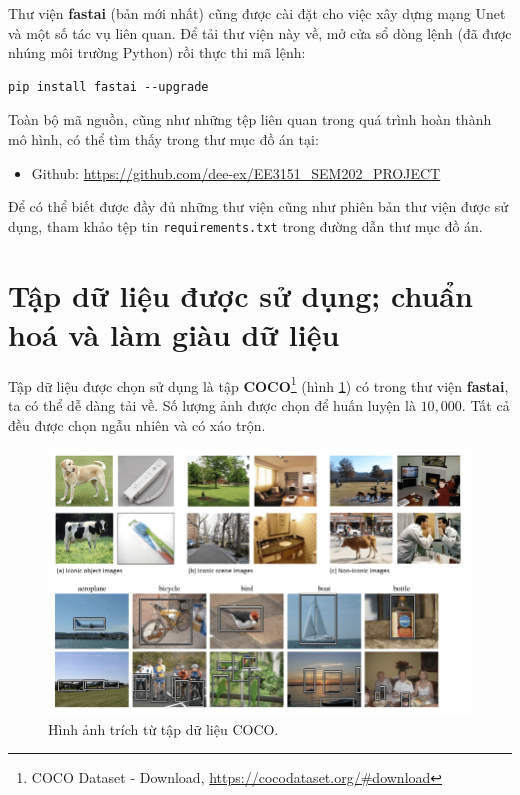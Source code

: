 \documentclass[a4paper, 12pt]{report}
\begin{document}
Thư viện \textbf{fastai} (bản mới nhất) cũng được cài đặt cho việc xây dựng mạng Unet và một số tác vụ liên quan.
Để tải thư viện này về, mở cửa sổ dòng lệnh (đã được nhúng môi trường Python) rồi thực thi mã lệnh:

\begin{lstlisting}
pip install fastai --upgrade
\end{lstlisting}

Toàn bộ mã nguồn, cũng như những tệp liên quan trong quá trình hoàn thành mô hình, có thể tìm thấy trong thư mục đồ án tại:

\begin{itemize}
    \item Github: \href{https://github.com/dee-ex/EE3151\_SEM202\_PROJECT}{https://github.com/dee-ex/EE3151\_SEM202\_PROJECT}
\end{itemize}

Để có thể biết được đầy đủ những thư viện cũng như phiên bản thư viện được sử dụng, tham khảo tệp tin \texttt{requirements.txt} trong đường dẫn thư mục đồ án.

\section{Tập dữ liệu được sử dụng; chuẩn hoá và làm giàu dữ liệu}\label{normalization}

Tập dữ liệu được chọn sử dụng là tập \textbf{COCO}\footnote{COCO Dataset - Download, \href{https://cocodataset.org/\#download}{https://cocodataset.org/\#download}} (hình \ref{fig:cocodataset}) có trong thư viện \textbf{fastai}, ta có thể dễ dàng tải về.
Số lượng ảnh được chọn để huấn luyện là $10,000$.
Tất cả đều được chọn ngẫu nhiên và có xáo trộn.

\begin{figure}[!h]
\captionsetup{width=0.8\textwidth}
\centering
\includegraphics[width=15cm]{images/3_1.png}
\caption{Hình ảnh trích từ tập dữ liệu COCO.}
\label{fig:cocodataset}
\end{figure}
\end{document}
